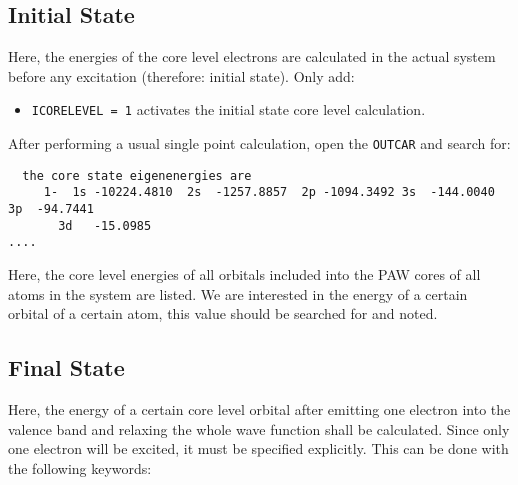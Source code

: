 \documentclass[a4paper,11pt]{article}
\begin{document}
\subsection{Initial State}

Here, the energies of the core level electrons are calculated in the actual system before 
any excitation (therefore: initial state).
Only add: 

\begin{itemize}
 \item \texttt{ICORELEVEL = 1} activates the initial state core level calculation.
\end{itemize}

After performing a usual single point calculation, open the \texttt{OUTCAR} and search
for:

\begin{verbatim}
  the core state eigenenergies are
     1-  1s -10224.4810  2s  -1257.8857  2p -1094.3492 3s  -144.0040 3p  -94.7441
       3d   -15.0985
....
\end{verbatim}

Here, the core level energies of all orbitals included into the PAW cores of all 
atoms in the system are listed. 
We are interested in the energy of a certain orbital of a certain atom, this value
should be searched for and noted.

\subsection{Final State}

Here, the energy of a certain core level orbital after emitting one electron into the 
valence band and relaxing the whole wave function shall be calculated.
Since only one electron will be excited, it must be specified explicitly.
This can be done with the following keywords:
\end{document}
